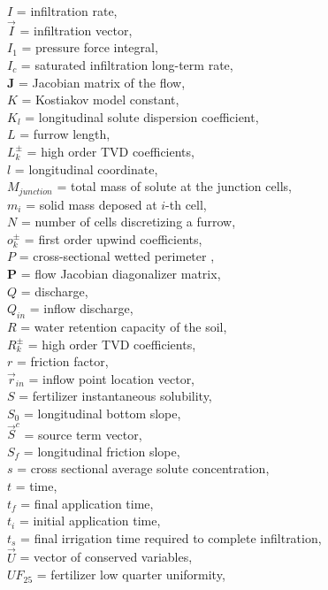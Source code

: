 \documentclass[review,authoryear]{elsarticle}
\begin{document}
$I$ = infiltration rate,\\
$\vec{I}$ = infiltration vector,\\
$I_1$ = pressure force integral,\\
$I_c$ = saturated infiltration long-term rate,\\
$\mathbf{J}$ = Jacobian matrix of the flow,\\
$K$ = Kostiakov model constant,\\
$K_l$ = longitudinal solute dispersion coefficient,\\
$L$ = furrow length,\\
$L_k^\pm$ = high order TVD coefficients,\\
$l$ = longitudinal coordinate,\\
$M_{junction}$ = total mass of solute at the junction cells,\\
$m_i$ = solid mass deposed at $i$-th cell,\\
$N$ = number of cells discretizing a furrow,\\
$o_k^\pm$ = first order upwind coefficients,\\
$P$ = cross-sectional wetted perimeter ,\\
$\mathbf{P}$ = flow Jacobian diagonalizer matrix,\\
$Q$ = discharge,\\
$Q_{in}$ = inflow discharge,\\
$R$ = water retention capacity of the soil,\\
$R_k^\pm$ = high order TVD coefficients,\\
$r$ = friction factor,\\
$\vec{r}_{in}$ = inflow point location vector,\\
$S$ = fertilizer instantaneous solubility,\\
$S_0$ = longitudinal bottom slope,\\
$\vec{S}^c$ = source term vector,\\
$S_f$ = longitudinal friction slope,\\
$s$ = cross sectional average solute concentration,\\
$t$ = time,\\
$t_f$ = final application time,\\
$t_i$ = initial application time,\\
$t_s$ = final irrigation time required to complete infiltration,\\
$\vec{U}$ = vector of conserved variables,\\
$UF_{25}$ = fertilizer low quarter uniformity,\\
\end{document}
